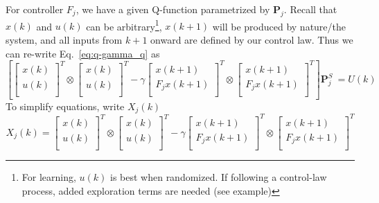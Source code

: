 For controller $F_j$, we have a given Q-function parametrized by $\textbf{P}_j$. Recall that $x\left(k\right)$ and $u\left(k\right)$ can be arbitrary\footnote{For learning, $u(k)$ is best when randomized. If following a control-law process, added exploration terms are needed (see example)}, $x\left(k+1\right)$ will be produced by nature/the system, and all inputs from $k+1$ onward are defined by our control law. Thus we can re-write Eq.~\ref{eq:q-gamma_q} as
\begin{equation}
    \left[{\left[\begin{matrix}x\left(k\right)\\u\left(k\right)\\\end{matrix}\right]}^T\otimes{\left[\begin{matrix}x\left(k\right)\\u\left(k\right)\\\end{matrix}\right]}^T-{\gamma\left[\begin{matrix}x\left(k+1\right)\\F_{j}x\left(k+1\right)\\\end{matrix}\right]}^T\otimes{\left[\begin{matrix}x\left(k+1\right)\\F_{j}x\left(k+1\right)\\\end{matrix}\right]}^T\right]\textbf{P}_j^S\ =U\left(k\right)
    \label{eq:XjPjU}
\end{equation}
To simplify equations, write $X_j\left(k\right)$
\begin{equation}
    X_j\left(k\right)={\left[\begin{matrix}x\left(k\right)\\u\left(k\right)\\\end{matrix}\right]}^T\otimes{\left[\begin{matrix}x\left(k\right)\\u\left(k\right)\\\end{matrix}\right]}^T-{\gamma\left[\begin{matrix}x\left(k+1\right)\\F_j x\left(k+1\right)\\\end{matrix}\right]}^T\otimes{\left[\begin{matrix}x\left(k+1\right)\\F_j x\left(k+1\right)\\\end{matrix}\right]}^T
    \label{eq:Xj}
\end{equation}
